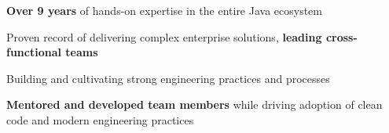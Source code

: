 

\begin{cvparagraph}

    \vspace{10pt}
    \begin{cvitems} %
        \item {\textbf{Over 9 years} of hands-on expertise in the entire Java ecosystem}
        \item {Proven record of delivering complex enterprise solutions, \textbf{leading cross-functional teams}}
        \item {Building and cultivating strong engineering practices and processes}
        \item {\textbf{Mentored and developed team members} while driving adoption of clean code and modern engineering practices}
    \end{cvitems}
\end{cvparagraph}
